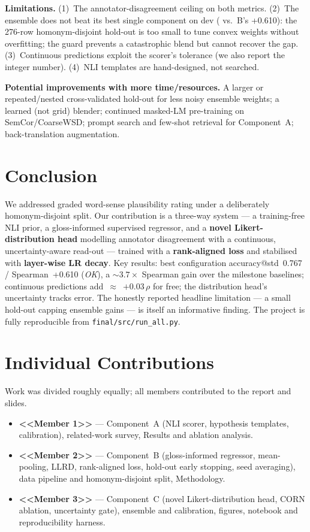\documentclass[11pt]{article}
\newcommand{\MEMBERA}{<<Member 1>>}
\newcommand{\MEMBERB}{<<Member 2>>}
\newcommand{\MEMBERC}{<<Member 3>>}
\newcommand{\Bacc}{0.767}\newcommand{\Brho}{+0.610}
\begin{document}
\textbf{Limitations.} (1)~The annotator-disagreement ceiling on both metrics.
(2)~The ensemble does not beat its best single component on dev
(\EnsRho{} vs.\ B's \Brho{}): the 276-row homonym-disjoint hold-out is too
small to tune convex weights without overfitting; the guard prevents a
catastrophic blend but cannot recover the gap. (3)~Continuous predictions
exploit the scorer's tolerance (we also report the integer number).
(4)~NLI templates are hand-designed, not searched.

\textbf{Potential improvements with more time/resources.} A larger or
repeated/nested cross-validated hold-out for less noisy ensemble weights; a
learned (not grid) blender; continued masked-LM pre-training on
SemCor/CoarseWSD; prompt search and few-shot retrieval for Component~A;
back-translation augmentation.

\section{Conclusion}
We addressed graded word-sense plausibility rating under a deliberately
homonym-disjoint split. Our contribution is a three-way system --- a
training-free NLI prior, a gloss-informed supervised regressor, and a
\textbf{novel Likert-distribution head} modelling annotator disagreement with
a continuous, uncertainty-aware read-out --- trained with a
\textbf{rank-aligned loss} and stabilised with \textbf{layer-wise LR decay}.
Key results: best configuration accuracy@std~\Bacc{} / Spearman~\Brho{}
(\emph{OK}), a $\sim$$3.7\times$ Spearman gain over the milestone baselines;
continuous predictions add~\mbox{$\approx$}~$+0.03\,\rho$ for free; the
distribution head's uncertainty tracks error. The honestly reported headline
limitation --- a small hold-out capping ensemble gains --- is itself an
informative finding. The project is fully reproducible from
\texttt{final/src/run\_all.py}.

\section{Individual Contributions}
Work was divided roughly equally; all members contributed to the report and
slides.
\begin{itemize}
\item \textbf{\MEMBERA{}} --- Component~A (NLI scorer, hypothesis templates,
      calibration), related-work survey, Results and ablation analysis.
\item \textbf{\MEMBERB{}} --- Component~B (gloss-informed regressor,
      mean-pooling, LLRD, rank-aligned loss, hold-out early stopping, seed
      averaging), data pipeline and homonym-disjoint split, Methodology.
\item \textbf{\MEMBERC{}} --- Component~C (novel Likert-distribution head,
      CORN ablation, uncertainty gate), ensemble and calibration, figures,
      notebook and reproducibility harness.
\end{itemize}
\end{document}

